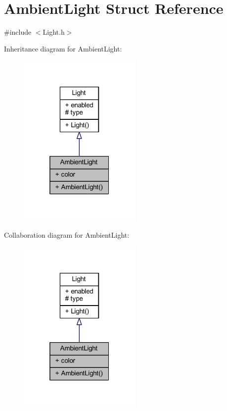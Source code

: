 \hypertarget{struct_ambient_light}{}\section{Ambient\+Light Struct Reference}
\label{struct_ambient_light}


{\ttfamily \#include $<$Light.\+h$>$}



Inheritance diagram for Ambient\+Light\+:\nopagebreak
\begin{figure}[H]
\begin{center}
\leavevmode
\includegraphics[width=169pt]{struct_ambient_light__inherit__graph}
\end{center}
\end{figure}


Collaboration diagram for Ambient\+Light\+:\nopagebreak
\begin{figure}[H]
\begin{center}
\leavevmode
\includegraphics[width=169pt]{struct_ambient_light__coll__graph}
\end{center}
\end{figure}
